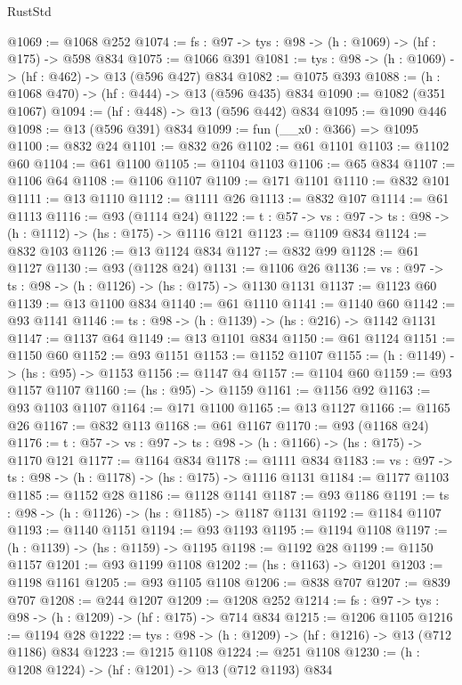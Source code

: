 \begin{lexlean}{RustStd}
\begin{coremodule}
@1069 := @1068 @252
@1074 := {fs : @97} -> {tys : @98} -> (h : @1069) -> (hf : @175) -> @598 @834
@1075 := @1066 @391
@1081 := {tys : @98} -> (h : @1069) -> (hf : @462) -> @13 (@596 @427) @834
@1082 := @1075 @393
@1088 := (h : @1068 @470) -> (hf : @444) -> @13 (@596 @435) @834
@1090 := @1082 (@351 @1067)
@1094 := (hf : @448) -> @13 (@596 @442) @834
@1095 := @1090 @446
@1098 := @13 (@596 @391) @834
@1099 := fun (__x0 : @366) => @1095
@1100 := @832 @24
@1101 := @832 @26
@1102 := @61 @1101
@1103 := @1102 @60
@1104 := @61 @1100
@1105 := @1104 @1103
@1106 := @65 @834
@1107 := @1106 @64
@1108 := @1106 @1107
@1109 := @171 @1101
@1110 := @832 @101
@1111 := @13 @1110
@1112 := @1111 @26
@1113 := @832 @107
@1114 := @61 @1113
@1116 := @93 (@1114 @24)
@1122 := {t : @57} -> {vs : @97} -> {ts : @98} -> (h : @1112) -> (hs : @175) -> @1116 @121
@1123 := @1109 @834
@1124 := @832 @103
@1126 := @13 @1124 @834
@1127 := @832 @99
@1128 := @61 @1127
@1130 := @93 (@1128 @24)
@1131 := @1106 @26
@1136 := {vs : @97} -> {ts : @98} -> (h : @1126) -> (hs : @175) -> @1130 @1131
@1137 := @1123 @60
@1139 := @13 @1100 @834
@1140 := @61 @1110
@1141 := @1140 @60
@1142 := @93 @1141
@1146 := {ts : @98} -> (h : @1139) -> (hs : @216) -> @1142 @1131
@1147 := @1137 @64
@1149 := @13 @1101 @834
@1150 := @61 @1124
@1151 := @1150 @60
@1152 := @93 @1151
@1153 := @1152 @1107
@1155 := (h : @1149) -> (hs : @95) -> @1153
@1156 := @1147 @4
@1157 := @1104 @60
@1159 := @93 @1157 @1107
@1160 := (hs : @95) -> @1159
@1161 := @1156 @92
@1163 := @93 @1103 @1107
@1164 := @171 @1100
@1165 := @13 @1127
@1166 := @1165 @26
@1167 := @832 @113
@1168 := @61 @1167
@1170 := @93 (@1168 @24)
@1176 := {t : @57} -> {vs : @97} -> {ts : @98} -> (h : @1166) -> (hs : @175) -> @1170 @121
@1177 := @1164 @834
@1178 := @1111 @834
@1183 := {vs : @97} -> {ts : @98} -> (h : @1178) -> (hs : @175) -> @1116 @1131
@1184 := @1177 @1103
@1185 := @1152 @28
@1186 := @1128 @1141
@1187 := @93 @1186
@1191 := {ts : @98} -> (h : @1126) -> (hs : @1185) -> @1187 @1131
@1192 := @1184 @1107
@1193 := @1140 @1151
@1194 := @93 @1193
@1195 := @1194 @1108
@1197 := (h : @1139) -> (hs : @1159) -> @1195
@1198 := @1192 @28
@1199 := @1150 @1157
@1201 := @93 @1199 @1108
@1202 := (hs : @1163) -> @1201
@1203 := @1198 @1161
@1205 := @93 @1105 @1108
@1206 := @838 @707
@1207 := @839 @707
@1208 := @244 @1207
@1209 := @1208 @252
@1214 := {fs : @97} -> {tys : @98} -> (h : @1209) -> (hf : @175) -> @714 @834
@1215 := @1206 @1105
@1216 := @1194 @28
@1222 := {tys : @98} -> (h : @1209) -> (hf : @1216) -> @13 (@712 @1186) @834
@1223 := @1215 @1108
@1224 := @251 @1108
@1230 := (h : @1208 @1224) -> (hf : @1201) -> @13 (@712 @1193) @834

\end{coremodule}
\end{lexlean}
